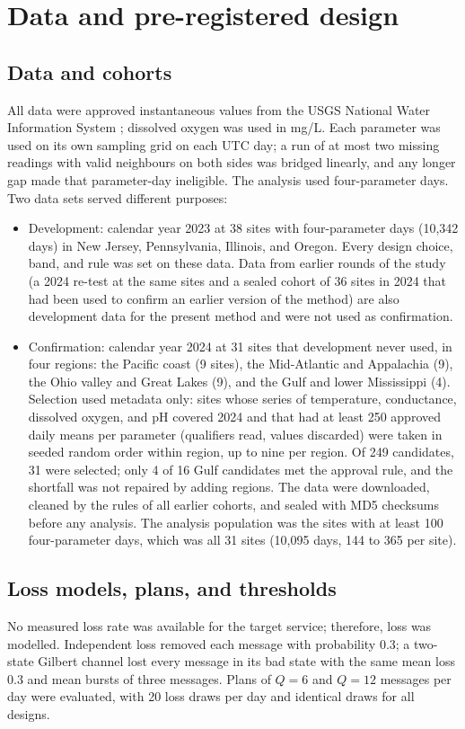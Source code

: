 \section{Data and pre-registered design}
\label{sec:study}

\subsection{Data and cohorts}
\label{sec:data}
All data were approved instantaneous values from the USGS National Water Information System \citep{usgs2016nwis}; dissolved oxygen was used in mg/L. Each parameter was used on its own sampling grid on each UTC day; a run of at most two missing readings with valid neighbours on both sides was bridged linearly, and any longer gap made that parameter-day ineligible. The analysis used four-parameter days. Two data sets served different purposes:
\begin{itemize}
  \item Development: calendar year 2023 at 38 sites with four-parameter days (10,342 days) in New Jersey, Pennsylvania, Illinois, and Oregon. Every design choice, band, and rule was set on these data. Data from earlier rounds of the study (a 2024 re-test at the same sites and a sealed cohort of 36 sites in 2024 that had been used to confirm an earlier version of the method) are also development data for the present method and were not used as confirmation.
  \item Confirmation: calendar year 2024 at 31 sites that development never used, in four regions: the Pacific coast (9 sites), the Mid-Atlantic and Appalachia (9), the Ohio valley and Great Lakes (9), and the Gulf and lower Mississippi (4). Selection used metadata only: sites whose series of temperature, conductance, dissolved oxygen, and pH covered 2024 and that had at least 250 approved daily means per parameter (qualifiers read, values discarded) were taken in seeded random order within region, up to nine per region. Of 249 candidates, 31 were selected; only 4 of 16 Gulf candidates met the approval rule, and the shortfall was not repaired by adding regions. The data were downloaded, cleaned by the rules of all earlier cohorts, and sealed with MD5 checksums before any analysis. The analysis population was the sites with at least 100 four-parameter days, which was all 31 sites (10,095 days, 144 to 365 per site).
\end{itemize}

\subsection{Loss models, plans, and thresholds}
\label{sec:channels}
No measured loss rate was available for the target service; therefore, loss was modelled. Independent loss removed each message with probability 0.3; a two-state Gilbert channel \citep{gilbert1960,elliott1963} lost every message in its bad state with the same mean loss 0.3 and mean bursts of three messages. Plans of $Q = 6$ and $Q = 12$ messages per day were evaluated, with 20 loss draws per day and identical draws for all designs.

